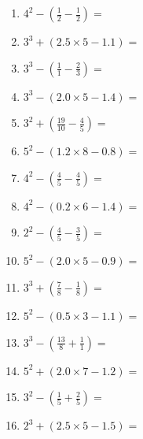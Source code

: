 \documentclass[12pt]{article}
\begin{document}
\begin{enumerate}
\item \large $ 4^{2} - (\frac{1}{2} - \frac{1}{2}) = $ \vspace{1.6cm}
\item \large $ 3^{3} + (2.5 \times 5 - 1.1) = $ \vspace{1.6cm}
\item \large $ 3^{3} - (\frac{1}{1} - \frac{2}{3}) = $ \vspace{1.6cm}
\item \large $ 3^{3} - (2.0 \times 5 - 1.4) = $ \vspace{1.6cm}
\item \large $ 3^{2} + (\frac{19}{10} - \frac{4}{5}) = $ \vspace{1.6cm}
\item \large $ 5^{2} - (1.2 \times 8 - 0.8) = $ \vspace{1.6cm}
\newpage
\item \large $ 4^{2} - (\frac{4}{5} - \frac{4}{5}) = $ \vspace{1.6cm}
\item \large $ 4^{2} - (0.2 \times 6 - 1.4) = $ \vspace{1.6cm}
\item \large $ 2^{2} - (\frac{4}{5} - \frac{3}{5}) = $ \vspace{1.6cm}
\item \large $ 5^{2} - (2.0 \times 5 - 0.9) = $ \vspace{1.6cm}
\item \large $ 3^{3} + (\frac{7}{8} - \frac{1}{8}) = $ \vspace{1.6cm}
\item \large $ 5^{2} - (0.5 \times 3 - 1.1) = $ \vspace{1.6cm}
\item \large $ 3^{3} - (\frac{13}{8} + \frac{1}{1}) = $ \vspace{1.6cm}
\item \large $ 5^{2} + (2.0 \times 7 - 1.2) = $ \vspace{1.6cm}
\item \large $ 3^{2} - (\frac{1}{5} + \frac{2}{5}) = $ \vspace{1.6cm}
\item \large $ 2^{3} + (2.5 \times 5 - 1.5) = $ \vspace{1.6cm}
\end{enumerate}\newpage
\end{document}
